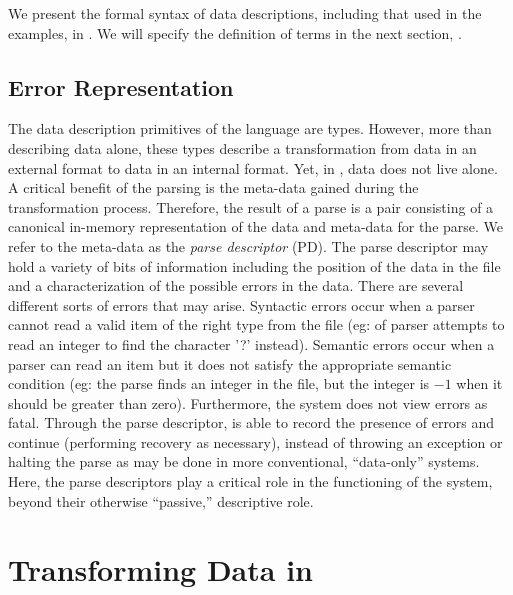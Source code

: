 \documentclass{entcs}
\begin{document}
We present the formal syntax of data descriptions, including that used
in the examples, in . We will specify the
definition of terms  in the next section, .

\subsection{Error Representation}

The data description primitives of the \pads{} language are types.
However, more than describing data alone, these types describe a
transformation from data in an external format to data in an internal
format.  Yet, in \pads{}, data does not live alone. A critical benefit
of the parsing is the meta-data gained during the transformation
process.  Therefore, the result of a parse is a pair consisting of a
canonical in-memory representation of the data and meta-data for the
parse.  We refer to the meta-data as the {\em parse descriptor} (PD).
The parse descriptor may hold a variety of bits of information
including the position of the data in the file and a characterization
of the possible errors in the data.  There are several different sorts
of errors that may arise.  Syntactic errors occur when a parser cannot
read a valid item of the right type from the file (eg: of parser
attempts to read an integer to find the character '?'  instead).
Semantic errors occur when a parser can read an item but it does not
satisfy the appropriate semantic condition (eg: the parse finds an
integer in the file, but the integer is $-1$ when it should be greater
than zero).  Furthermore, the \pads{} system does not view errors as
fatal. Through the parse descriptor, \pads{} is able to record the
presence of errors and continue (performing recovery as necessary),
instead of throwing an exception or halting the parse as may be done
in more conventional, ``data-only'' systems. Here, the parse
descriptors play a critical role in the functioning of the system,
beyond their otherwise ``passive,'' descriptive role.

\section{Transforming Data in \datatype{}}
\label{sec:data-transformation}
\end{document}
